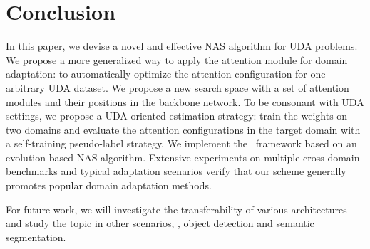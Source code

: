 \documentclass[10pt,twocolumn,letterpaper]{article}
\begin{document}
%
 
\section{Conclusion}
In this paper, we devise a novel and effective NAS algorithm for UDA problems.
We propose a more generalized way to apply the attention module for domain adaptation: to automatically optimize the attention configuration for one arbitrary UDA dataset.
We propose a new search space with a set of attention modules and their positions in the backbone network.
To be consonant with UDA settings, we propose a UDA-oriented estimation strategy: train the weights on two domains and evaluate the attention configurations in the target domain with a self-training pseudo-label strategy.
We implement the \iMethod\ framework based on an evolution-based NAS algorithm. Extensive experiments on multiple cross-domain benchmarks and typical adaptation scenarios verify that our scheme generally promotes popular domain adaptation methods.

For future work, we will investigate the transferability of various architectures and study the topic in other scenarios, \eg, object detection and semantic segmentation. 
{\small


}
\end{document}
